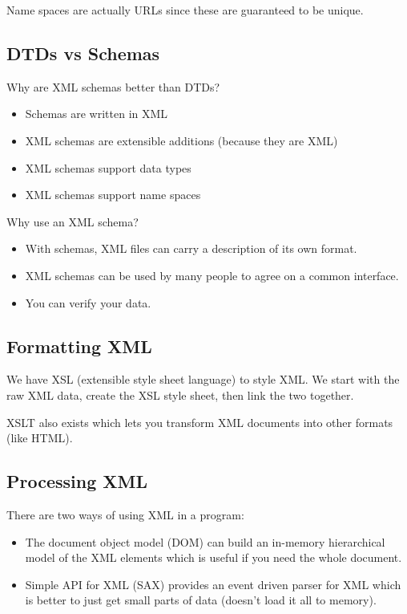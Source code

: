 \begin{note}
    Name spaces are actually URLs since these are guaranteed to be unique.
\end{note}

\subsection{DTDs vs Schemas}\label{sub:dtds_vs_schemas}

Why are XML schemas better than DTDs?
\begin{itemize}
    \item Schemas are written in XML
    \item XML schemas are extensible additions (because they are XML)
    \item XML schemas support data types
    \item XML schemas support name spaces
\end{itemize}
Why use an XML schema?
\begin{itemize}
    \item With schemas, XML files can carry a description of its own format.
    \item XML schemas can be used by many people to agree on a common interface.
    \item You can verify your data.
\end{itemize}

\subsection{Formatting XML}\label{sub:formatting_xml}

We have XSL (extensible style sheet language) to style XML.
We start with the raw XML data, create the XSL style sheet, then link the two together.

\begin{note}
    XSLT also exists which lets you transform XML documents into other formats (like HTML).
\end{note}

\subsection{Processing XML}\label{sub:processing_xml}

There are two ways of using XML in a program:
\begin{itemize}
    \item The document object model (DOM) can build an in-memory hierarchical model of the XML elements which is useful if you need the whole document.
    \item Simple API for XML (SAX) provides an event driven parser for XML which is better to just get small parts of data (doesn't load it all to memory).
\end{itemize}

